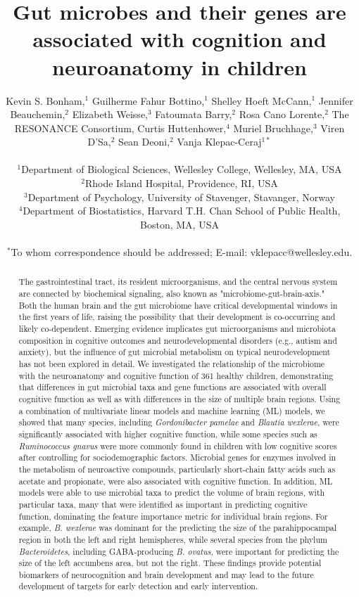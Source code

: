 \documentclass{article}
\title{Gut microbes and their genes are associated with cognition and neuroanatomy in children}
\author{%
    \parbox{\linewidth}{\centering
        Kevin S. Bonham,$^{1}$
        Guilherme Fahur Bottino,$^{1}$
        Shelley Hoeft McCann,$^{1}$
        Jennifer Beauchemin,$^{2}$
        Elizabeth Weisse,$^{3}$
        Fatoumata Barry,$^{2}$
        Rosa Cano Lorente,$^{2}$
        The RESONANCE Consortium,
        Curtis Huttenhower,$^{4}$
        Muriel Bruchhage,$^{3}$
        Viren D'Sa,$^{2}$
        Sean Deoni,$^{2}$
        Vanja Klepac-Ceraj$^{1\ast}$
    }
\\
\normalsize{$^{1}$Department of Biological Sciences, Wellesley College, Wellesley, MA, USA}\\
\normalsize{$^{2}$Rhode Island Hospital, Providence, RI, USA}\\
\normalsize{$^{3}$Department of Psychology, University of Stavenger, Stavanger, Norway}\\
\normalsize{$^{4}$Department of Biostatistics, Harvard T.H. Chan School of Public Health, Boston, MA, USA}\\
\\
\normalsize{$^\ast$To whom correspondence should be addressed; E-mail:  vklepacc@wellesley.edu.}
}
\date{}
\begin{document}
\baselineskip24pt

\maketitle 

\begin{abstract}
The gastrointestinal tract, its resident microorganisms, and the central
nervous system are connected by biochemical signaling, also known as
"microbiome-gut-brain-axis." Both the human brain and the gut microbiome
have critical developmental windows in the first years of life,
raising the possibility that their development is co-occurring and
likely co-dependent. Emerging evidence implicates gut microorganisms and
microbiota composition in cognitive outcomes and neurodevelopmental
disorders (e.g., autism and anxiety), but the influence of gut microbial
metabolism on typical neurodevelopment has not been explored in detail.
We investigated the relationship of the microbiome with the neuroanatomy
and cognitive function of 361 healthy children, demonstrating that
differences in gut microbial taxa and gene functions are associated with
overall cognitive function as well as with differences in the size of
multiple brain regions.
Using a combination of multivariate linear
models and machine learning (ML) models, we showed that many species,
including \emph{Gordonibacter pamelae} and \emph{Blautia wexlerae}, were
significantly associated with higher cognitive function, while some
species such as \emph{Ruminococcus gnavus} were more commonly found in
children with low cognitive scores after controlling for sociodemographic factors.
Microbial genes for enzymes involved in the metabolism of
neuroactive compounds, particularly short-chain fatty acids such as
acetate and propionate, were also associated with cognitive function.
In addition, ML models were able to use microbial taxa to predict the
volume of brain regions, with particular taxa, many that were identified
as important in predicting cognitive function, dominating the
feature importance metric for individual brain regions. For example, \emph{B.
wexlerae} was dominant for the predicting the size of the parahippocampal region
in both the left and right hemispheres, while several species from
the phylum \textit{Bacteroidetes}, including GABA-producing
\emph{B. ovatus}, were important for predicting
the size of the left accumbens area, but not the right. These
findings provide potential biomarkers of neurocognition and brain development
and may lead to the future development of targets for early detection and early
intervention.
\end{abstract}
\end{document}
